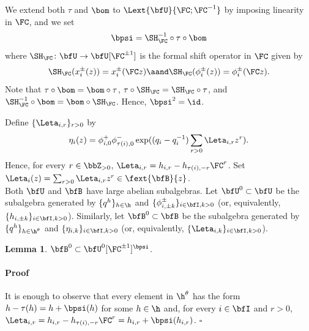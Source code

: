 \documentclass[reqno]{amsart}
\numberwithin{equation}{section}
\newtheorem*{lemma}{Lemma}
\newenvironment{pf}{\medskip\paragraph{{\sc Proof}}}{\hfill$\square$\par\medskip}
\begin{document}
We extend both $\tau$ and $\bom$ to $\Lext{\bfU}{\FC;\FC^{-1}}$ by imposing linearity in $\FC$, and we set 
\begin{equation}
\bpsi=\SH_\FC^{-1}\circ\tau\circ\bom
\end{equation}
where $\SH_\FC\colon\bfU\to\bfU[\FC^{\pm1}]$ is the formal shift operator in $\FC$ given by
\begin{equation}
	\SH_\FC(x^{\pm}_i(z))=x^{\pm}_i(\FC z)
	\aand
	\SH_\FC(\phi^{\pm}_i(z))=\phi^{\pm}_i(\FC z).
\end{equation}
Note that $\tau\circ\bom=\bom\circ\tau$, $\tau\circ\SH_\FC=\SH_\FC\circ\tau$, and
$\SH_\FC^{-1}\circ\bom=\bom\circ\SH_\FC$. Hence, $\bpsi^2=\id$.

Define $\{\Leta_{i,r}\}_{r>0}$ by
\begin{equation}\label{eq:def-rho}
	\eta_i(z)=\phi^+_{i,0}\phi^-_{\tau(i),0}\exp((q_i-q_i^{-1})\sum_{r>0}\Leta_{i,r}z^r).
\end{equation}
Hence, for every $r\in\bbZ_{>0}$, $\Leta_{i,r}=h_{i,r}-h_{\tau(i),-r}\FC^{r}$.
Set $\Leta_i(z)=\sum_{r>0}\Leta_{i,r}z^r\in\fext{\bfB}{z}$.\\

Both $\bfU$ and $\bfB$ have large abelian subalgebras.
Let $\bfU^0\subset\bfU$ be the subalgebra generated by $\{q^h\}_{h\in\h}$ and $\{\phi^{\pm}_{i,\pm k}\}_{i\in\bfI,k>0}$ (or, equivalently, $\{h_{i,\pm k}\}_{i\in\bfI, k>0}$).
Similarly, let $\bfB^0\subset\bfB$ be the subalgebra generated by $\{q^{h}\}_{h\in\h^{\theta}}$ and $\{\eta_{i,k}\}_{i\in\bfI, k> 0}$ (or, equivalently, $\{\Leta_{i,k}\}_{i\in\bfI, k>0}$).

\begin{lemma}
$\bfB^0\subset\bfU^0[\FC^{\pm1}]^{\bpsi}$.
\end{lemma}

\begin{pf}
It is enough to observe that every element in $\h^{\theta}$ has the form $h-\tau(h)=h+\bpsi(h)$ for some $h\in\h$ and, for every $i\in\bfI$ and $r>0$, $\Leta_{i,r}=h_{i,r}-h_{\tau(i),-r}\FC^r=h_{i,r}+\bpsi(h_{i,r})$.
\end{pf}	
\end{document}
